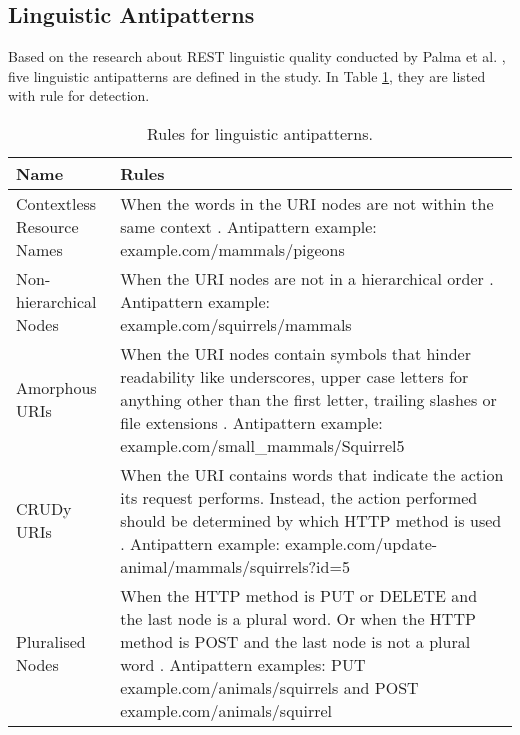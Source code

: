 \subsection{Linguistic Antipatterns}
\label{linguisticAntipatterns}

Based on the research about REST linguistic quality conducted by Palma et al. \cite{linguistic}, five linguistic antipatterns are defined in the study. In Table \ref{tab:Rulesforlinguisticantipatterns}, they are listed with rule for detection.
\begin{center}
\begin{table}[!ht]
\small
\begin{tabular}{|p{30mm}|p{105mm}|}
\hline \textbf{Name} & \textbf{Rules} \\
\hline 
Contextless Resource Names &
When the words in the URI nodes are not within the same context \cite{linguistic}. \newline Antipattern example: example.com/mammals/pigeons\\ \hline
Non-hierarchical Nodes &
When the URI nodes are not in a hierarchical order \cite{linguistic}. \newline Antipattern example: example.com/squirrels/mammals\\ \hline
Amorphous URIs &
When the URI nodes contain symbols that hinder readability like underscores, upper case letters for anything other than the first letter, trailing slashes or file extensions \cite{linguistic}. \newline Antipattern example: 
example.com/small\_mammals/Squirrel5\\ \hline
CRUDy URIs &
When the URI contains words that indicate the action its request performs. Instead, the action performed should be determined by which HTTP method is used \cite{linguistic}. \newline Antipattern example: 
example.com/update-animal/mammals/squirrels?id=5\\ \hline
Pluralised Nodes
&
When the HTTP method is PUT or DELETE and the last node is a plural word. Or when the HTTP method is POST and the last node is not a plural word \cite{linguistic}. \newline Antipattern examples: PUT example.com/animals/squirrels and POST example.com/animals/squirrel

\\ \hline
\end{tabular}
 \caption{Rules for linguistic antipatterns.}
 \label{tab:Rulesforlinguisticantipatterns}
\end{table}
\end{center}

